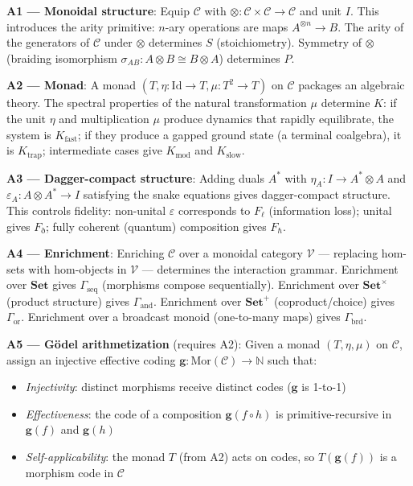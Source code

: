 \documentclass[12pt,a4paper]{article}
\begin{document}
\textbf{A1 --- Monoidal structure}: Equip $\mathcal{C}$ with $\otimes: \mathcal{C} \times \mathcal{C} \to \mathcal{C}$ and unit $I$. This introduces the arity primitive: $n$-ary operations are maps $A^{\otimes n} \to B$. The arity of the generators of $\mathcal{C}$ under $\otimes$ determines $S$ (stoichiometry). Symmetry of $\otimes$ (braiding isomorphism $\sigma_{AB}: A \otimes B \cong B \otimes A$) determines $P$.

\textbf{A2 --- Monad}: A monad $(T, \eta: \text{Id} \to T, \mu: T^2 \to T)$ on $\mathcal{C}$ packages an algebraic theory. The spectral properties of the natural transformation $\mu$ determine $K$: if the unit $\eta$ and multiplication $\mu$ produce dynamics that rapidly equilibrate, the system is $K_\text{fast}$; if they produce a gapped ground state (a terminal coalgebra), it is $K_\text{trap}$; intermediate cases give $K_\text{mod}$ and $K_\text{slow}$.

\textbf{A3 --- Dagger-compact structure}: Adding duals $A^*$ with $\eta_A: I \to A^* \otimes A$ and $\varepsilon_A: A \otimes A^* \to I$ satisfying the snake equations gives dagger-compact structure. This controls fidelity: non-unital $\varepsilon$ corresponds to $F_{\ell}$ (information loss); unital gives $F_{\eth}$; fully coherent (quantum) composition gives $F_{\hbar}$.

\textbf{A4 --- Enrichment}: Enriching $\mathcal{C}$ over a monoidal category $\mathcal{V}$ --- replacing hom-sets with hom-objects in $\mathcal{V}$ --- determines the interaction grammar. Enrichment over $\mathbf{Set}$ gives $\Gamma_\text{seq}$ (morphisms compose sequentially). Enrichment over $\mathbf{Set}^\times$ (product structure) gives $\Gamma_\text{and}$. Enrichment over $\mathbf{Set}^+$ (coproduct/choice) gives $\Gamma_\text{or}$. Enrichment over a broadcast monoid (one-to-many maps) gives $\Gamma_\text{brd}$.

\textbf{A5 --- G\"odel arithmetization} (requires A2): Given a monad $(T, \eta, \mu)$ on $\mathcal{C}$, assign an injective effective coding $\mathbf{g}: \text{Mor}(\mathcal{C}) \to \mathbb{N}$ such that:

\begin{itemize}
    \item \emph{Injectivity}: distinct morphisms receive distinct codes ($\mathbf{g}$ is 1-to-1)
    \item \emph{Effectiveness}: the code of a composition $\mathbf{g}(f \circ h)$ is primitive-recursive in $\mathbf{g}(f)$ and $\mathbf{g}(h)$
    \item \emph{Self-applicability}: the monad $T$ (from A2) acts on codes, so $T(\mathbf{g}(f))$ is a morphism code in $\mathcal{C}$
\end{itemize}
\end{document}
